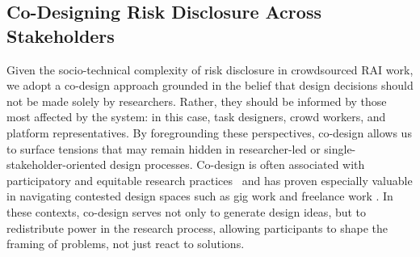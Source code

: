 

\subsection{Co-Designing Risk Disclosure Across Stakeholders}
Given the socio-technical complexity of risk disclosure in crowdsourced RAI work, we adopt a co-design approach grounded in the belief that design decisions should not be made solely by researchers. Rather, they should be informed by those most affected by the system: in this case, task designers, crowd workers, and platform representatives. By foregrounding these perspectives, co-design allows us to surface tensions that may remain hidden in researcher-led or single-stakeholder-oriented design processes.
Co-design is often associated with participatory and equitable research practices~\cite{muller_participatory_nodate} and has proven especially valuable in navigating contested  design spaces such as gig work and freelance work \cite{huang2024design, hsieh_designing_2023}. In these contexts, co-design serves not only to generate design ideas, but to redistribute power in the research process, allowing participants to shape the framing of problems, not just react to solutions.

